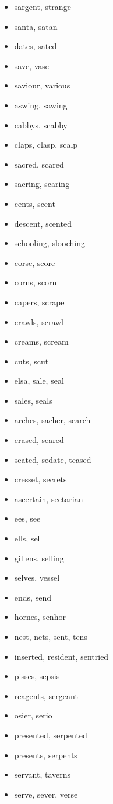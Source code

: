\documentclass[a4wide,11pt]{report}
\begin{document}
\begin{itemize}
  \item sargent, strange
  \item santa, satan
  \item dates, sated
  \item save, vase
  \item saviour, various
  \item aswing, sawing
  \item cabbys, scabby
  \item claps, clasp, scalp
  \item sacred, scared
  \item sacring, scaring
  \item cents, scent
  \item descent, scented
  \item schooling, slooching
  \item corse, score
  \item corns, scorn
  \item capers, scrape
  \item crawls, scrawl
  \item creams, scream
  \item cuts, scut
  \item elsa, sale, seal
  \item sales, seals
  \item arches, sacher, search
  \item erased, seared
  \item seated, sedate, teased
  \item cresset, secrets
  \item ascertain, sectarian
  \item ees, see
  \item ells, sell
  \item gillens, selling
  \item selves, vessel
  \item ends, send
  \item hornes, senhor
  \item nest, nets, sent, tens
  \item inserted, resident, sentried
  \item pisses, sepsis
  \item reagents, sergeant
  \item osier, serio
  \item presented, serpented
  \item presents, serpents
  \item servant, taverns
  \item serve, sever, verse

\end{itemize}
\end{document}

